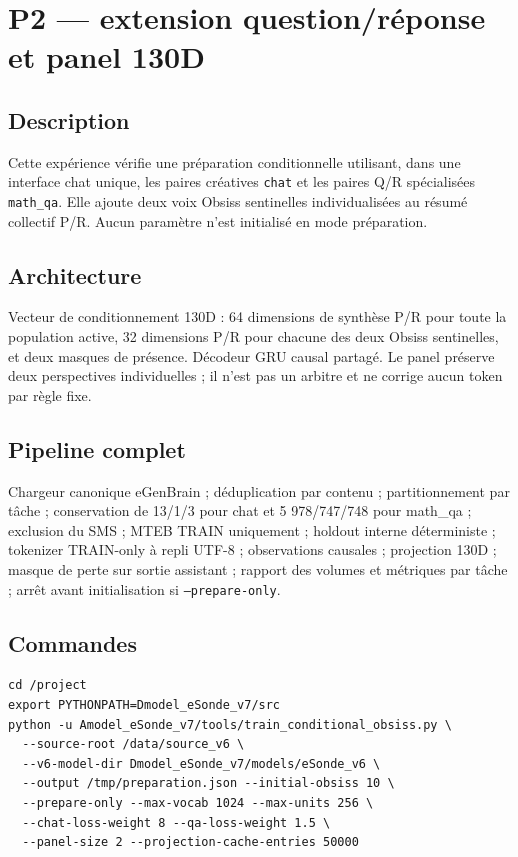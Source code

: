 \documentclass[11pt,a4paper]{report}
\begin{document}
\chapter{P2 — extension question/réponse et panel 130D}
\section{Description}
Cette expérience vérifie une préparation conditionnelle utilisant, dans une interface chat unique, les paires créatives \texttt{chat} et les paires Q/R spécialisées \texttt{math\_qa}. Elle ajoute deux voix Obsiss sentinelles individualisées au résumé collectif P/R. Aucun paramètre n'est initialisé en mode préparation.
\section{Architecture}
Vecteur de conditionnement 130D : 64 dimensions de synthèse P/R pour toute la population active, 32 dimensions P/R pour chacune des deux Obsiss sentinelles, et deux masques de présence. Décodeur GRU causal partagé. Le panel préserve deux perspectives individuelles ; il n'est pas un arbitre et ne corrige aucun token par règle fixe.
\section{Pipeline complet}
Chargeur canonique eGenBrain ; déduplication par contenu ; partitionnement par tâche ; conservation de 13/1/3 pour chat et 5 978/747/748 pour math\_qa ; exclusion du SMS ; MTEB TRAIN uniquement ; holdout interne déterministe ; tokenizer TRAIN-only à repli UTF-8 ; observations causales ; projection 130D ; masque de perte sur sortie assistant ; rapport des volumes et métriques par tâche ; arrêt avant initialisation si \texttt{--prepare-only}.
\section{Commandes}
\begin{verbatim}
cd /project
export PYTHONPATH=Dmodel_eSonde_v7/src
python -u Amodel_eSonde_v7/tools/train_conditional_obsiss.py \
  --source-root /data/source_v6 \
  --v6-model-dir Dmodel_eSonde_v7/models/eSonde_v6 \
  --output /tmp/preparation.json --initial-obsiss 10 \
  --prepare-only --max-vocab 1024 --max-units 256 \
  --chat-loss-weight 8 --qa-loss-weight 1.5 \
  --panel-size 2 --projection-cache-entries 50000
\end{verbatim}
\end{document}
